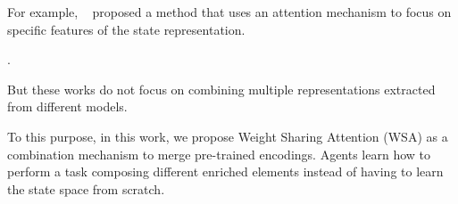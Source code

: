 For example, ~\citet{bramlage2022generalized} proposed a method that uses an attention mechanism to focus on specific features of the state representation.

\citet{blakeman2022selective}.

But these works do not focus on combining multiple representations extracted from different models.


To this purpose, in this work, we propose Weight Sharing Attention (WSA) as a combination mechanism to merge pre-trained encodings.
Agents learn how to perform a task composing different enriched elements instead of having to learn the state space from scratch.


%
